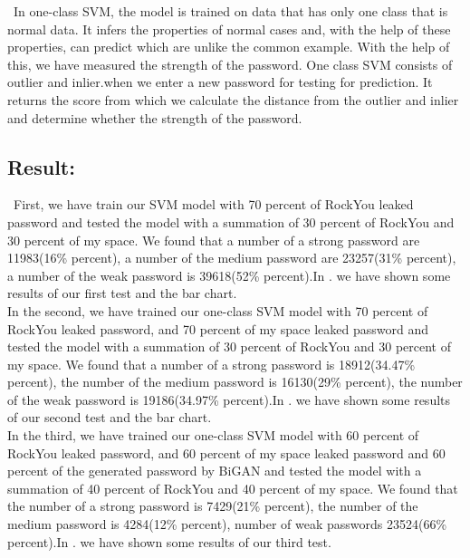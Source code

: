 \documentclass[runningheads]{llncs}
\begin{document}
{~In one-class SVM, the model is trained on data that has only one class that is normal data. It infers the properties of normal cases and, with the help of these properties, can predict which are unlike the common example. With the help of this, we have measured the strength of the password. One class SVM consists of outlier and inlier.when we enter a new password for testing for prediction. It returns the score from which we calculate the distance from the outlier and inlier and determine whether the strength of the password.\\
\hfill \break
\subsection{\textbf{Result:}}{~First, we have train our SVM model with 70 percent of RockYou leaked password and tested the model with a summation of 30 percent of RockYou and 30 percent of my space. We found that a number of a strong password are 11983(16\% percent), a number of the medium password are 23257(31\% percent), a number of the weak password is 39618(52\% percent).In  . we have shown some results of our first test and the bar chart.
\newline
\\
In the second, we have trained our one-class SVM model with 70 percent of RockYou leaked password, and 70 percent of my space leaked password and tested the model with a summation of 30 percent of RockYou and 30 percent of my space. We found that a number of a strong password is 18912(34.47\% percent), the number of the medium password is 16130(29\% percent), the number of the weak password is 19186(34.97\% percent).In  . we have shown some results of our second test and the bar chart.
\newline
\\
In the third, we have trained our one-class SVM model with 60 percent of RockYou leaked password, and 60 percent of my space leaked password and 60 percent of the generated password by BiGAN and tested the model with a summation of 40 percent of RockYou and 40 percent of my space. We found that the number of a strong password is 7429(21\% percent), the number of the medium password is 4284(12\% percent), number of weak passwords 23524(66\% percent).In . we have shown some results of our third test.
\begin{figure}
  \centering
  \begin{minipage}[b]{0.4\textwidth}

\end{minipage}
\end{figure}}}
\end{document}
